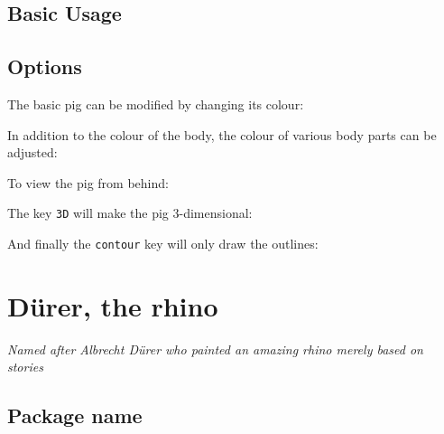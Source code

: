 \documentclass[parskip=half]{scrartcl}
\begin{document}
\subsection{Basic Usage}

\begin{tcblisting}{}
\pig
\end{tcblisting}

\subsection{Options}

The basic pig can be modified by changing its colour:
\begin{tcblisting}{}
\pig[body=blue]
\end{tcblisting}

In addition to the colour of the body, the colour of various body parts can be adjusted:
\begin{tcblisting}{}
\pig[eye=red]
\end{tcblisting}
\begin{tcblisting}{}
\pig[tail=red]
\end{tcblisting}
\begin{tcblisting}{}
\pig[mouth=red]
\end{tcblisting}

To view the pig from behind:
\begin{tcblisting}{}
\pig[back]
\end{tcblisting}

The key \lstinline|3D| will make the pig 3-dimensional:
\begin{tcblisting}{}
\pig[3D]
\end{tcblisting}

And finally the \lstinline|contour| key will only draw the outlines:
\begin{tcblisting}{}
\pig[contour=black]
\end{tcblisting}

%
%
\clearpage
\section[Rhino]{D\"urer, the rhino}

\emph{Named after Albrecht D\"urer who painted an amazing rhino merely based on stories}

\subsection{Package name}
\end{document}
